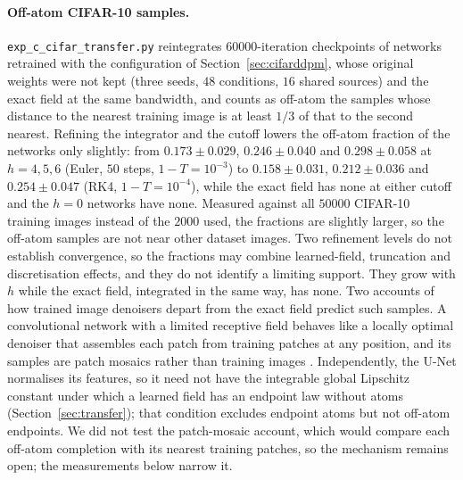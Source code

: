 \documentclass{article} %
\theoremstyle{plain}
\theoremstyle{definition}
\theoremstyle{remark}
\begin{document}
\paragraph{Off-atom CIFAR-10 samples.} \texttt{exp\_c\_cifar\_transfer.py} reintegrates
$60000$-iteration checkpoints of networks retrained with the configuration of
Section~\ref{sec:cifarddpm}, whose original weights were not kept (three seeds, $48$ conditions,
$16$ shared sources) and the exact field at the same bandwidth, and counts as off-atom the samples
whose distance to the nearest training image is at least $1/3$ of that to the second nearest. Refining
the integrator and the cutoff lowers the off-atom fraction of the networks only slightly: from
$0.173\pm0.029$, $0.246\pm0.040$ and $0.298\pm0.058$ at $h=4,5,6$ (Euler, $50$ steps,
$1-T=10^{-3}$) to $0.158\pm0.031$, $0.212\pm0.036$ and $0.254\pm0.047$ (RK4, $1-T=10^{-4}$),
while the exact field has none at either cutoff and the $h=0$ networks have none. Measured
against all $50000$ CIFAR-10 training images instead of the $2000$ used, the fractions are
slightly larger, so the off-atom samples are not near other dataset images. Two refinement levels
do not establish convergence, so the fractions may combine learned-field, truncation and
discretisation effects, and they do not identify a limiting support. They grow with $h$ while the
exact field, integrated in the same way, has none. Two accounts of how trained
image denoisers depart from the exact field predict such samples. A convolutional network
with a limited receptive field behaves like a locally optimal denoiser that assembles each patch
from training patches at any position, and its samples are patch mosaics rather than training
images \citep{kamb2024creativity,niedoba2024mechanistic}. Independently, the U-Net normalises its
features, so it need not have the integrable global Lipschitz constant under which a learned
field has an endpoint law without atoms (Section~\ref{sec:transfer}); that condition excludes endpoint atoms
but not off-atom endpoints. We
did not test the patch-mosaic account, which would compare each off-atom completion with its
nearest training patches, so the mechanism remains open; the measurements below narrow it.
\end{document}
